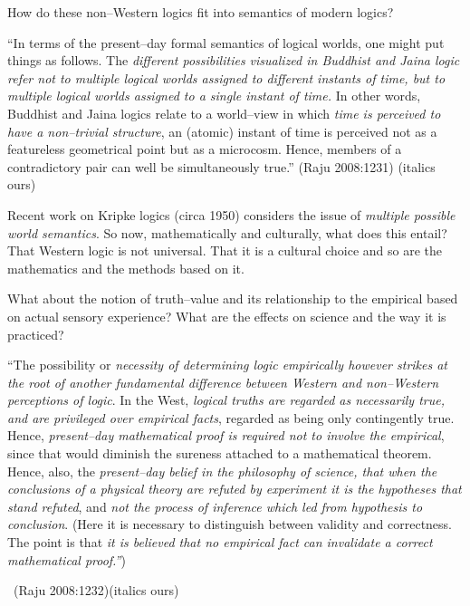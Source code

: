 How do these non–Western logics fit into semantics of modern logics?

\begin{myquote}
“In terms of the present–day formal semantics of logical worlds, one might put things as follows. The \textit{different possibilities visualized in Buddhist and Jaina logic refer not to multiple logical worlds assigned to different instants of time, but to multiple logical worlds assigned to a single instant of time.} In other words, Buddhist and Jaina logics relate to a world–view in which \textit{time is perceived to have a non–trivial structure}, an (atomic) instant of time is perceived not as a featureless geometrical point but as a microcosm. Hence, members of a contradictory pair can well be simultaneously true.” \hfill (Raju 2008:1231) (italics ours)
\end{myquote}

Recent work on Kripke logics (circa 1950) considers the issue of \textit{multiple possible world semantics}. So now, mathematically and culturally, what does this entail? That Western logic is not universal. That it is a cultural choice and so are the mathematics and the methods based on it.

What about the notion of truth–value and its relationship to the empirical based on actual sensory experience? What are the effects on science and the way it is practiced?

\begin{myquote}
“The possibility or \textit{necessity of determining logic empirically however strikes at the root of another fundamental difference between Western and non–Western perceptions of logic}. In the West, \textit{logical truths are regarded as necessarily true, and are privileged over empirical facts}, regarded as being only contingently true. Hence, \textit{present–day mathematical proof is required not to involve the empirical}, since that would diminish the sureness attached to a mathematical theorem. Hence, also, the \textit{present–day belief in the philosophy of science, that when the conclusions of a physical theory are refuted by experiment it is the hypotheses that stand refuted}, and \textit{not the process of inference which led from hypothesis to conclusion}. (Here it is necessary to distinguish between validity and correctness. The point is that \textit{it is believed that no empirical fact can invalidate a correct mathematical proof.”}) 

~\hfill (Raju 2008:1232)(italics ours)
\end{myquote}

